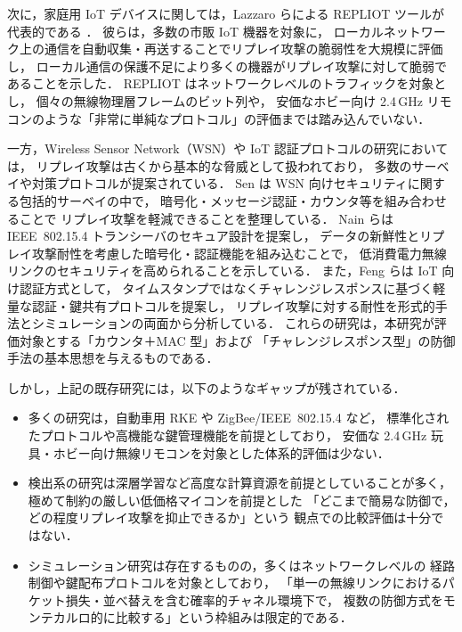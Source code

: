 \documentclass[twocolumn,10pt,a4paper]{jsarticle}
\begin{document}
次に，家庭用 IoT デバイスに関しては，Lazzaro らによる REPLIOT ツールが代表的である
\cite{Lazzaro2024,LazzaroREPLIOT}．
彼らは，多数の市販 IoT 機器を対象に，
ローカルネットワーク上の通信を自動収集・再送することでリプレイ攻撃の脆弱性を大規模に評価し，
ローカル通信の保護不足により多くの機器がリプレイ攻撃に対して脆弱であることを示した．
REPLIOT はネットワークレベルのトラフィックを対象とし，
個々の無線物理層フレームのビット列や，
安価なホビー向け 2.4\,GHz リモコンのような「非常に単純なプロトコル」の評価までは踏み込んでいない．

一方，Wireless Sensor Network（WSN）や IoT 認証プロトコルの研究においては，
リプレイ攻撃は古くから基本的な脅威として扱われており，
多数のサーベイや対策プロトコルが提案されている．
Sen は WSN 向けセキュリティに関する包括的サーベイの中で，
暗号化・メッセージ認証・カウンタ等を組み合わせることで
リプレイ攻撃を軽減できることを整理している\cite{SenWSNSurvey}．
Nain らは IEEE~802.15.4 トランシーバのセキュア設計を提案し，
データの新鮮性とリプレイ攻撃耐性を考慮した暗号化・認証機能を組み込むことで，
低消費電力無線リンクのセキュリティを高められることを示している\cite{Nain2017}．
また，Feng らは IoT 向け認証方式として，
タイムスタンプではなくチャレンジレスポンスに基づく軽量な認証・鍵共有プロトコルを提案し，
リプレイ攻撃に対する耐性を形式的手法とシミュレーションの両面から分析している\cite{Feng2017}．
これらの研究は，本研究が評価対象とする「カウンタ＋MAC 型」および
「チャレンジレスポンス型」の防御手法の基本思想を与えるものである．

しかし，上記の既存研究には，以下のようなギャップが残されている．

\begin{itemize}
  \item 多くの研究は，自動車用 RKE や ZigBee/IEEE~802.15.4 など，
        標準化されたプロトコルや高機能な鍵管理機能を前提としており，
        安価な 2.4\,GHz 玩具・ホビー向け無線リモコンを対象とした体系的評価は少ない．
  \item 検出系の研究は深層学習など高度な計算資源を前提としていることが多く，
        極めて制約の厳しい低価格マイコンを前提とした
        「どこまで簡易な防御で，どの程度リプレイ攻撃を抑止できるか」という
        観点での比較評価は十分ではない．
  \item シミュレーション研究は存在するものの，多くはネットワークレベルの
        経路制御や鍵配布プロトコルを対象としており，
        「単一の無線リンクにおけるパケット損失・並べ替えを含む確率的チャネル環境下で，
        複数の防御方式をモンテカルロ的に比較する」という枠組みは限定的である．
\end{itemize}
\end{document}
